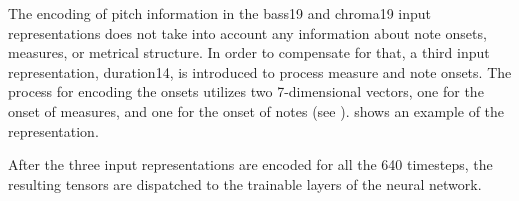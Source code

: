 
The encoding of pitch information in the \gls{bass19} and
\gls{chroma19} input representations does not take into
account any information about note onsets, measures, or
metrical structure. In order to compensate for that, a third
input representation, \gls{duration14}, is introduced to
process measure and note onsets. The process for encoding
the onsets utilizes two 7-dimensional vectors, one for the
onset of measures, and one for the onset of notes (see
). 
shows an example of the representation.


After the three input representations are encoded for all
the 640 timesteps, the resulting tensors are dispatched to
the trainable layers of the neural network.
